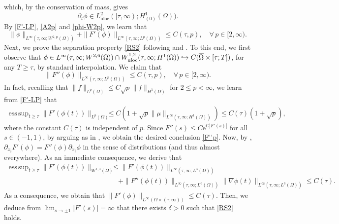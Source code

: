 \documentclass[11pt,reqno]{amsart}
\theoremstyle{remark}
\DeclareMathOperator*{\esssup}{ess\,sup}
\numberwithin{equation}{section}
\newcommand{\uloc}{\operatorname{uloc}}
\begin{document}
which,  by the conservation of mass,
 gives 
 $$
 \partial_t \phi \in L^2_{\uloc}([\tau,\infty); H^{1}_{(0)}(\Omega)).
 $$
  By \eqref{F'-LP}, \eqref{A2p} and \eqref{phi-W2p}, we learn that
\begin{equation}
\label{phi2p}
\| \phi\|_{L^\infty(\tau,\infty; W^{2,p}(\Omega))}
+ \| F'(\phi)\|_{L^\infty(\tau,\infty; L^p(\Omega))}
\leq C(\tau, p), \quad \forall \, p \in [2,\infty).
\end{equation}
Next, we prove the separation property \eqref{RS2} following \cite{CG} and \cite{HW2021}. To this end, we first observe that $\phi \in L^\infty(\tau,\infty; W^{2,6}(\Omega)) \cap W^{1,2}_{\rm uloc}(\tau, \infty;H^1(\Omega)) \hookrightarrow C(\overline{\Omega} \times [\tau; T])$, for any $T \geq \tau$, by standard interpolation. We claim that
\begin{equation}
\label{F''p}
\| F''(\phi)\|_{L^\infty(\tau,\infty; L^p(\Omega))}
\leq  C \left(\tau, p\right) \!, \quad \forall \, p \in [2,\infty).
\end{equation}
In fact, recalling that $\|f\|_{L^p(\Omega)}\leq C\sqrt{p}\|f\|_{H^1(\Omega)}$ for $2\leq p<\infty$, we learn from \eqref{F'-LP} that
\begin{align*}
\esssup_{t \geq \tau }\| F'(\phi(t))\|_{L^p(\Omega)}
&\leq C\left( 1+ \sqrt{p} \| \mu\|_{L^\infty(\tau,\infty;H^1(\Omega))} \right)
\leq C(\tau) ( 1+ \sqrt{p} ),
\end{align*}
where the constant $C(\tau)$ is independent of $p$. Since $F''(s)\leq C \mathrm{e}^{C |F'(s)|}$ for all $s \in (-1,1)$, by arguing as in \cite[pg. 2279--2281]{GGG2023}, we obtain the desired conclusion \eqref{F''p}.
Now, by \cite[Lemma 3.2]{HW2021}, $\partial_{x_i} F'(\phi)= F''(\phi) \partial_{x_i} \phi$ in the sense of distributions (and thus almost everywhere).
As an immediate consequence, we derive that
\begin{align*}
\esssup_{t \geq \tau } \| F'(\phi(t))\|_{W^{1,3}(\Omega)}
&\leq 
\| F'(\phi(t))\|_{L^\infty(\tau,\infty; L^{3}(\Omega))}
\\
& \quad + \| F''(\phi(t))\|_{ L^\infty(\tau,\infty; L^{6}(\Omega))}
\| \nabla \phi(t)\|_{L^\infty(\tau,\infty; L^{6}(\Omega))}
\leq  C(\tau).
\end{align*}
As a consequence, we obtain that $\| F'(\phi)\|_{L^\infty( \Omega \times (\tau,\infty) )} \leq C(\tau)$. 
Then, we deduce from $\displaystyle \lim_{s\to \pm 1} |F'(s)| = \infty$ that there exists $\delta>0$ such that  \eqref{RS2} holds.
\end{document}
